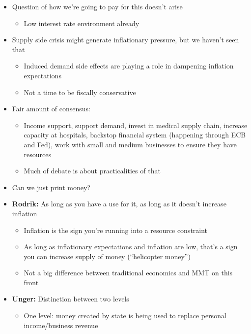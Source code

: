 \begin{itemize}
\tightlist
\item
  Question of how we're going to pay for this doesn't arise

  \begin{itemize}
  \tightlist
  \item
    Low interest rate environment already
  \end{itemize}
\item
  Supply side crisis might generate inflationary pressure, but we
  haven't seen that

  \begin{itemize}
  \tightlist
  \item
    Induced demand side effects are playing a role in dampening
    inflation expectations
  \item
    Not a time to be fiscally conservative
  \end{itemize}
\item
  Fair amount of consensus:

  \begin{itemize}
  \tightlist
  \item
    Income support, support demand, invest in medical supply chain,
    increase capacity at hospitals, backstop financial system (happening
    through ECB and Fed), work with small and medium businesses to
    ensure they have resources
  \item
    Much of debate is about practicalities of that
  \end{itemize}
\item
  Can we just print money?
\item
  \textbf{Rodrik:} As long as you have a use for it, as long as it
  doesn't increase inflation

  \begin{itemize}
  \tightlist
  \item
    Inflation is the sign you're running into a resource constraint
  \item
    As long as inflationary expectations and inflation are low, that's a
    sign you can increase supply of money (``helicopter money'')
  \item
    Not a big difference between traditional economics and MMT on this
    front
  \end{itemize}
\item
  \textbf{Unger:} Distinction between two levels

  \begin{itemize}
  \tightlist
  \item
    One level: money created by state is being used to replace personal
    income/business revenue


\end{itemize}
\end{itemize}
